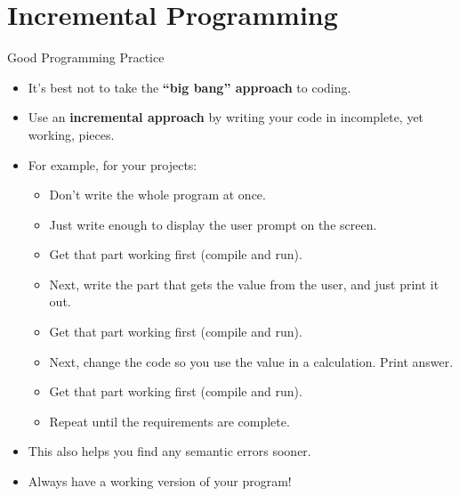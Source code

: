 \documentclass[graphics]{beamer}
\begin{document}
\section{Incremental Programming}\label{sec:incprog}
\begin{frame}{Good Programming Practice}
    \begin{itemize}
        \item It's best not to take the \textbf{``big bang'' approach} to coding.
        \item Use an \textbf{incremental approach} by writing your code in incomplete, yet working, pieces.
        \item For example, for your projects:
        \begin{itemize}
            \item Don't write the whole program at once.
            \item Just write enough to display the user prompt on the screen.
            \item Get that part working first (compile and run).
            \item Next, write the part that gets the value from the user, and just print it out.
            \item Get that part working first (compile and run).
            \item Next, change the code so you use the value in a calculation. Print answer.
            \item Get that part working first (compile and run).
            \item Repeat until the requirements are complete.
        \end{itemize}
        \item This also helps you find any semantic errors sooner.
        \item Always have a working version of your program!
    \end{itemize}
\end{frame}
\end{document}
